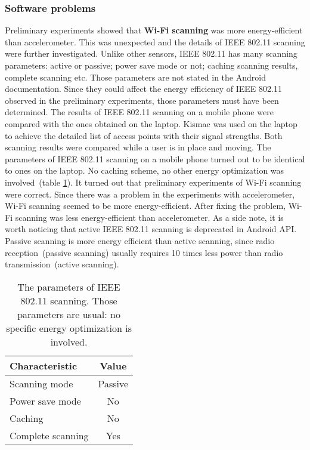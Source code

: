 \subsubsection{Software problems}
\hspace{10pt} Preliminary experiments showed that \textbf{Wi-Fi scanning} was more energy-efficient than accelerometer. This was unexpected and the details of IEEE 802.11 scanning were further investigated. Unlike other sensors, IEEE 802.11 has many scanning parameters: active or passive; power save mode or not; caching scanning results, complete scanning etc. Those parameters are not stated in the Android documentation. Since they could affect the energy efficiency of IEEE 802.11 observed in the preliminary experiments, those parameters must have been determined. The results of IEEE 802.11 scanning on a mobile phone were compared with the ones obtained on the laptop. Kismac \cite{kismac:kismac} was used on the laptop to achieve the detailed list of access points with their signal strengths. Both scanning results were compared while a user is in place and moving. The parameters of IEEE 802.11 scanning on a mobile phone turned out to be identical to ones on the laptop. No caching scheme, no other energy optimization was involved\ (table \ref{table:wifiparameters}). It turned out that preliminary experiments of Wi-Fi scanning were correct. Since there was a problem in the experiments with accelerometer, Wi-Fi scanning seemed to be more energy-efficient. After fixing the problem, Wi-Fi scanning was less energy-efficient than accelerometer. As a side note, it is worth noticing that active IEEE 802.11 scanning is deprecated in Android API. Passive scanning is more energy efficient than active scanning, since radio reception\ (passive scanning) usually requires 10 times less power than radio transmission\ (active scanning).

\begin{table}[H]
\centering
    \begin{tabular}{| l | c |}
    \hline
    	Characteristic & Value \\ \hline
    	Scanning mode & Passive \\ \hline
    	Power save mode & No \\ \hline
    	Caching & No \\ \hline
    	Complete scanning & Yes \\ \hline
    \end{tabular}
    \caption{The parameters of IEEE 802.11 scanning. Those parameters are usual: no specific energy optimization is involved.}
	\label{table:wifiparameters}
\end{table}

